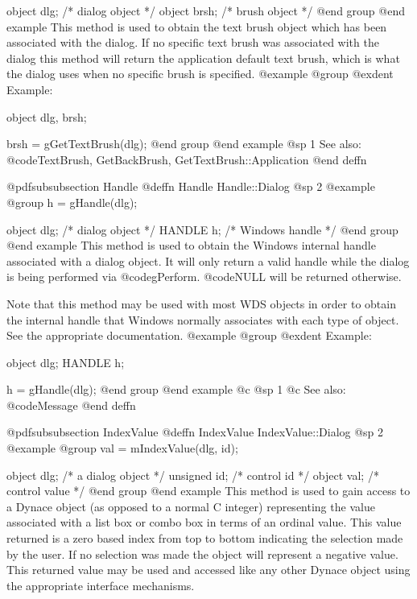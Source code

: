 object  dlg;    /*  dialog object  */
object  brsh;   /*  brush object   */
@end group
@end example
This method is used to obtain the text brush object which has been associated
with the dialog.  If no specific text brush was associated with the dialog
this method will return the application default text brush, which is what
the dialog uses when no specific brush is specified.
@example
@group
@exdent Example:

object  dlg, brsh;

brsh = gGetTextBrush(dlg);
@end group
@end example
@sp 1
See also:  @code{TextBrush, GetBackBrush, GetTextBrush::Application}
@end deffn











@pdfsubsubsection {Handle}
@deffn {Handle} Handle::Dialog
@sp 2
@example
@group
h = gHandle(dlg);

object  dlg;    /*  dialog object   */
HANDLE  h;      /*  Windows handle  */
@end group
@end example
This method is used to obtain the Windows internal handle associated with
a dialog object.  It will only return a valid handle while the dialog
is being performed via @code{gPerform}.  @code{NULL} will be returned
otherwise.

Note that this method may be used with most WDS objects in order to obtain
the internal handle that Windows normally associates with each type of object.
See the appropriate documentation.
@example
@group
@exdent Example:

object  dlg;
HANDLE  h;

h = gHandle(dlg);
@end group
@end example
@c @sp 1
@c See also:  @code{Message}
@end deffn








@pdfsubsubsection {IndexValue}
@deffn {IndexValue} IndexValue::Dialog
@sp 2
@example
@group
val = mIndexValue(dlg, id);

object  dlg;    /*  a dialog object  */
unsigned id;    /*  control id       */
object  val;    /*  control value    */
@end group
@end example
This method is used to gain access to a Dynace object (as opposed to a
normal C integer) representing the value associated with a list box or
combo box in terms of an ordinal value. This value returned is a zero
based index from top to bottom indicating the selection made by the
user.  If no selection was made the object will represent a negative
value.  This returned value may be used and accessed like any other
Dynace object using the appropriate interface mechanisms.

